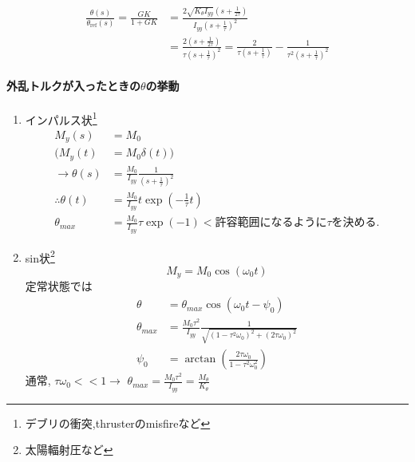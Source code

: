 \documentclass[class=article, crop=false, dvipdfmx]{standalone}
\begin{document}
\begin{enumerate}[label=(\theenumi)]
\begin{align}
\frac{\theta (s)}{\theta_{\mathrm{ref}} (s)}
= \frac{GK}{1+GK}
&= \frac{2 \sqrt{K_{\theta} I_{yy}}(s+\frac{1}{2\tau})}
{I_{yy}(s+\frac{1}{\tau})^2}\\
&=\frac{2(s+\frac{1}{2\tau})}{\tau (s+\frac{1}{\tau})^2}
=\frac{2}{\tau (s+\frac{1}{\tau})}
-\frac{1}{\tau^2 (s+\frac{1}{\tau})^2}
\end{align}

\paragraph{外乱トルクが入ったときの$\theta$の挙動}
\begin{enumerate}
\item{インパルス状\footnote{デブリの衝突,thrusterのmisfireなど}}
\begin{align}
M_y(s) &= M_0\\
(M_y(t) &= M_0 \delta(t))\\
\rightarrow 
\theta(s) &= \frac{M_0}{I_{yy}}
\frac{1}{(s+\frac{1}{\tau})^2}\\
\therefore 
\theta(t) &= \frac{M_0}{I_{yy}} 
t
\exp(-\frac{1}{\tau} t)\\
\theta_{max} &= \frac{M_0}{I_{yy}}\tau \exp(-1) 
<\text{許容範囲になるように}\tau\text{を決める.}
\end{align}
\item{sin状\footnote{太陽輻射圧など}}
\begin{equation}
M_y=M_0 \cos(\omega_0 t)
\end{equation}
定常状態では
\begin{align}
\theta &= \theta_{max} \cos(\omega_0 t - \psi_0)\\
\theta_{max} &= \frac{M_0 \tau^2}{I_{yy}}
\frac{1}
{\sqrt{(1-\tau^2 \omega_0)^2
+(2\tau \omega_0)^2}}\\
\psi_0 &= \arctan(\frac{2\tau \omega_0}{1- \tau^2 \omega_0^2})
\end{align}
通常,
$\tau \omega_0<< 1\rightarrow$
$\theta_{max} = \frac{M_0 \tau^2}{I_{yy}} = \frac{M_{\theta}}{K_\theta}$
\end{enumerate}

\end{enumerate}
\end{document}

